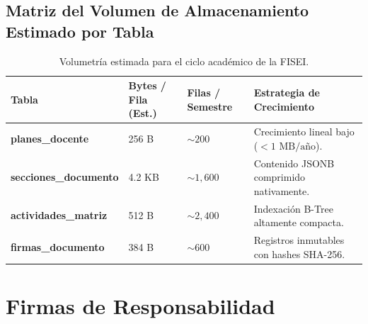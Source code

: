 \documentclass[12pt,a4paper]{article}
\begin{document}
\subsection{Matriz del Volumen de Almacenamiento Estimado por Tabla}
\begin{table}[H]
\centering
\small
\renewcommand{\arraystretch}{1.2}
\begin{tabularx}{\textwidth}{|>{\hsize=1.0\hsize\raggedright\arraybackslash\bfseries\footnotesize}X|>{\hsize=0.55\hsize\centering\arraybackslash\footnotesize}X|>{\hsize=0.55\hsize\centering\arraybackslash\footnotesize}X|>{\hsize=1.9\hsize\raggedright\arraybackslash\footnotesize}X|}
\hline
\rowcolor{tableheader}
\textbf{Tabla} & \textbf{Bytes / Fila (Est.)} & \textbf{Filas / Semestre} & \textbf{Estrategia de Crecimiento} \\
\hline
planes\allowbreak\_docente & 256 B & $\sim 200$ & Crecimiento lineal bajo ($<1\text{ MB/año}$). \\
\hline
secciones\allowbreak\_documento & 4.2 KB & $\sim 1{,}600$ & Contenido JSONB comprimido nativamente. \\
\hline
actividades\allowbreak\_matriz & 512 B & $\sim 2{,}400$ & Indexación B-Tree altamente compacta. \\
\hline
firmas\allowbreak\_documento & 384 B & $\sim 600$ & Registros inmutables con hashes SHA-256. \\
\hline
\end{tabularx}
\caption{Volumetría estimada para el ciclo académico de la FISEI.}
\end{table}

\section{Firmas de Responsabilidad}
\end{document}

